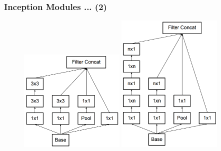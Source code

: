 \documentclass{beamer}
\begin{document}
\begin{frame}
	\frametitle{Inception Modules ... (2)}
	\begin{figure}
		\includegraphics[width=0.45\textwidth]{./figures/edit/breakdown_01.png}
		\hspace{0.05\textwidth} 
		\includegraphics[width=0.45\textwidth]{./figures/edit/breakdown_02.png}
	\end{figure}
\end{frame}
\end{document}
